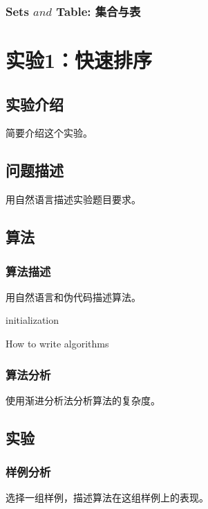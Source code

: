 \documentclass{ctexrep}
\begin{document}
\subsection{Sets $and$ Table: 集合与表}

\chapter{实验1：快速排序}
\section{实验介绍}
简要介绍这个实验。

\section{问题描述}
用自然语言描述实验题目要求。

\section{算法}
\subsection{算法描述}
用自然语言和伪代码描述算法。
\begin{algorithm}
\SetAlgoLined
{}
 initialization\;
 \caption{How to write algorithms}
\end{algorithm}

\subsection{算法分析}
使用渐进分析法分析算法的复杂度。

\section{实验}
\subsection{样例分析}
选择一组样例，描述算法在这组样例上的表现。
\end{document}
